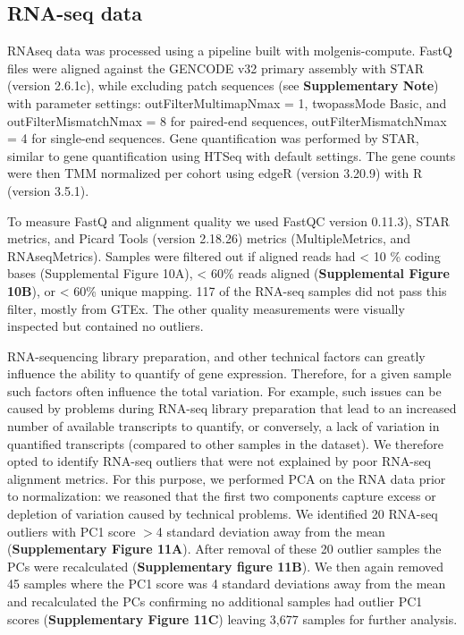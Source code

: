 \subsection{RNA-seq data}
RNAseq data was processed using a pipeline built with molgenis-compute\cite{byelasMOLGENISBasedComputational2011}. FastQ files were aligned against the GENCODE\cite{frankishGENCODEReferenceAnnotation2019} v32 primary assembly with STAR\cite{dobinSTARUltrafastUniversal2013} (version 2.6.1c), while excluding patch sequences (see \textbf{Supplementary Note}) with parameter settings: outFilterMultimapNmax = 1, twopassMode Basic, and outFilterMismatchNmax = 8 for paired-end sequences, outFilterMismatchNmax = 4 for single-end sequences. Gene quantification was performed by STAR, similar to gene quantification using HTSeq\cite{andersHTSeqPythonFramework2015} with default settings. The gene counts were then TMM\cite{robinsonScalingNormalizationMethod2010} normalized per cohort using edgeR\cite{robinsonEdgeRBioconductorPackage2010} (version 3.20.9) with R\cite{rcoreteamLanguageEnvironmentStatistical2017} (version 3.5.1). 

To measure FastQ and alignment quality we used FastQC\cite{BabrahamBioinformaticsFastQC} version 0.11.3), STAR metrics, and Picard Tools\cite{broadinstitutePicardTools2019} (version 2.18.26) metrics (MultipleMetrics, and RNAseqMetrics). Samples were filtered out if aligned reads had < 10
\% coding bases (Supplemental Figure 10A), < 60\% reads aligned (\textbf{Supplemental Figure 10B}), or < 60\% unique mapping. 117 of the RNA-seq samples did not pass this filter, mostly from GTEx\cite{consortiumGTExConsortiumAtlas2020}. The other quality measurements were visually inspected but contained no outliers. 

RNA-sequencing library preparation, and other technical factors can greatly influence the ability to quantify of gene expression. Therefore, for a given sample such factors often influence the total variation. For example, such issues can be caused by problems during RNA-seq library preparation that lead to an increased number of available transcripts to quantify, or conversely, a lack of variation in quantified transcripts (compared to other samples in the dataset). We therefore opted to identify RNA-seq outliers that were not explained by poor RNA-seq alignment metrics. For this purpose, we performed PCA on the RNA data prior to normalization: we reasoned that the first two components capture excess or depletion of variation caused by technical problems. We identified 20 RNA-seq outliers with PC1 score $>$4 standard deviation away from the mean (\textbf{Supplementary Figure 11A}). After removal of these 20 outlier samples the PCs were recalculated (\textbf{Supplementary figure 11B}). We then again removed 45 samples where the PC1 score was 4 standard deviations away from the mean and recalculated the PCs confirming no additional samples had outlier PC1 scores (\textbf{Supplementary Figure 11C}) leaving 3,677 samples for further analysis. 



